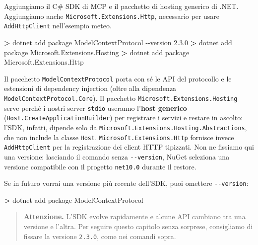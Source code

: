 \documentclass[
  italian,
  10pt,
]{book}
\newenvironment{Shaded}{\begin{snugshade}}{\end{snugshade}}
\newcommand{\AttributeTok}[1]{\textcolor[rgb]{0.13,0.29,0.53}{#1}}
\newcommand{\ExtensionTok}[1]{#1}
\newcommand{\NormalTok}[1]{#1}
\newcommand{\OperatorTok}[1]{\textcolor[rgb]{0.81,0.36,0.00}{\textbf{#1}}}
\begin{document}
Aggiungiamo il C\# SDK di MCP e il pacchetto di hosting generico di
.NET. Aggiungiamo anche \texttt{Microsoft.Extensions.Http}, necessario
per usare \texttt{AddHttpClient} nell'esempio meteo.

\begin{Shaded}
\begin{Highlighting}[]
\OperatorTok{\textgreater{}}\NormalTok{ dotnet }\ExtensionTok{add}\NormalTok{ package ModelContextProtocol }\AttributeTok{{-}{-}version}\NormalTok{ 2.3.0}
\OperatorTok{\textgreater{}}\NormalTok{ dotnet }\ExtensionTok{add}\NormalTok{ package Microsoft.Extensions.Hosting}
\OperatorTok{\textgreater{}}\NormalTok{ dotnet }\ExtensionTok{add}\NormalTok{ package Microsoft.Extensions.Http}
\end{Highlighting}
\end{Shaded}

Il pacchetto \texttt{ModelContextProtocol} porta con sé le API del
protocollo e le estensioni di dependency injection (oltre alla
dipendenza \texttt{ModelContextProtocol.Core}). Il pacchetto
\texttt{Microsoft.Extensions.Hosting} serve perché i nostri server
\texttt{stdio} useranno l'\textbf{host generico}
(\texttt{Host.CreateApplicationBuilder}) per registrare i servizi e
restare in ascolto: l'SDK, infatti, dipende solo da
\texttt{Microsoft.Extensions.Hosting.Abstractions}, che non include la
classe \texttt{Host}. \texttt{Microsoft.Extensions.Http} fornisce invece
\texttt{AddHttpClient} per la registrazione dei client HTTP tipizzati.
Non ne fissiamo qui una versione: lasciando il comando senza
\texttt{-\/-version}, NuGet seleziona una versione compatibile con il
progetto \texttt{net10.0} durante il restore.

Se in futuro vorrai una versione più recente dell'SDK, puoi omettere
\texttt{-\/-version}:

\begin{Shaded}
\begin{Highlighting}[]
\OperatorTok{\textgreater{}}\NormalTok{ dotnet }\ExtensionTok{add}\NormalTok{ package ModelContextProtocol}
\end{Highlighting}
\end{Shaded}

\begin{quote}
\textbf{Attenzione.} L'SDK evolve rapidamente e alcune API cambiano tra
una versione e l'altra. Per seguire questo capitolo senza sorprese,
consigliamo di fissare la versione \texttt{2.3.0}, come nei comandi
sopra.
\end{quote}
\end{document}
